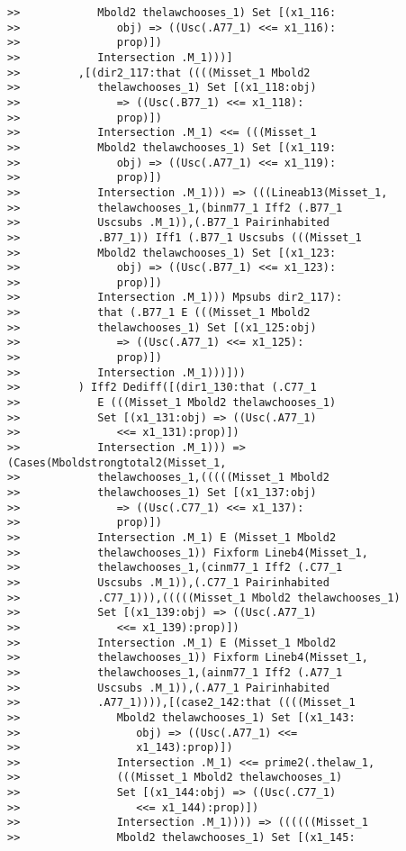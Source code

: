 \documentclass[12pt]{article}
\begin{document}
\begin{verbatim}
>>            Mbold2 thelawchooses_1) Set [(x1_116:
>>               obj) => ((Usc(.A77_1) <<= x1_116):
>>               prop)])
>>            Intersection .M_1)))]
>>         ,[(dir2_117:that ((((Misset_1 Mbold2
>>            thelawchooses_1) Set [(x1_118:obj)
>>               => ((Usc(.B77_1) <<= x1_118):
>>               prop)])
>>            Intersection .M_1) <<= (((Misset_1
>>            Mbold2 thelawchooses_1) Set [(x1_119:
>>               obj) => ((Usc(.A77_1) <<= x1_119):
>>               prop)])
>>            Intersection .M_1))) => (((Lineab13(Misset_1,
>>            thelawchooses_1,(binm77_1 Iff2 (.B77_1
>>            Uscsubs .M_1)),(.B77_1 Pairinhabited
>>            .B77_1)) Iff1 (.B77_1 Uscsubs (((Misset_1
>>            Mbold2 thelawchooses_1) Set [(x1_123:
>>               obj) => ((Usc(.B77_1) <<= x1_123):
>>               prop)])
>>            Intersection .M_1))) Mpsubs dir2_117):
>>            that (.B77_1 E (((Misset_1 Mbold2
>>            thelawchooses_1) Set [(x1_125:obj)
>>               => ((Usc(.A77_1) <<= x1_125):
>>               prop)])
>>            Intersection .M_1)))]))
>>         ) Iff2 Dediff([(dir1_130:that (.C77_1
>>            E (((Misset_1 Mbold2 thelawchooses_1)
>>            Set [(x1_131:obj) => ((Usc(.A77_1)
>>               <<= x1_131):prop)])
>>            Intersection .M_1))) => (Cases(Mboldstrongtotal2(Misset_1,
>>            thelawchooses_1,(((((Misset_1 Mbold2
>>            thelawchooses_1) Set [(x1_137:obj)
>>               => ((Usc(.C77_1) <<= x1_137):
>>               prop)])
>>            Intersection .M_1) E (Misset_1 Mbold2
>>            thelawchooses_1)) Fixform Lineb4(Misset_1,
>>            thelawchooses_1,(cinm77_1 Iff2 (.C77_1
>>            Uscsubs .M_1)),(.C77_1 Pairinhabited
>>            .C77_1))),(((((Misset_1 Mbold2 thelawchooses_1)
>>            Set [(x1_139:obj) => ((Usc(.A77_1)
>>               <<= x1_139):prop)])
>>            Intersection .M_1) E (Misset_1 Mbold2
>>            thelawchooses_1)) Fixform Lineb4(Misset_1,
>>            thelawchooses_1,(ainm77_1 Iff2 (.A77_1
>>            Uscsubs .M_1)),(.A77_1 Pairinhabited
>>            .A77_1)))),[(case2_142:that ((((Misset_1
>>               Mbold2 thelawchooses_1) Set [(x1_143:
>>                  obj) => ((Usc(.A77_1) <<=
>>                  x1_143):prop)])
>>               Intersection .M_1) <<= prime2(.thelaw_1,
>>               (((Misset_1 Mbold2 thelawchooses_1)
>>               Set [(x1_144:obj) => ((Usc(.C77_1)
>>                  <<= x1_144):prop)])
>>               Intersection .M_1)))) => ((((((Misset_1
>>               Mbold2 thelawchooses_1) Set [(x1_145:

\end{verbatim}
\end{document}
